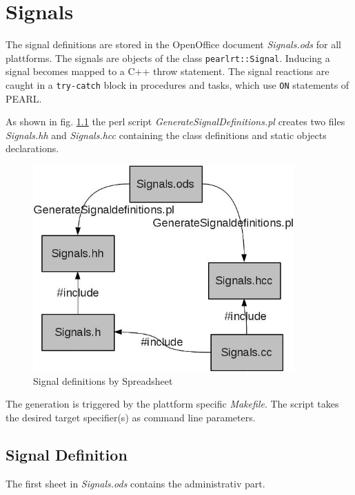 \chapter{Signals}
\label{chapter_signals}

The signal definitions are stored in the OpenOffice document {\em Signals.ods}
for all plattforms.
The signals are objects of the class \verb|pearlrt::Signal|. 
Inducing a signal becomes mapped to a C++ throw statement.
The signal reactions are caught in a \verb|try-catch| block in procedures and
tasks, which use \verb|ON| statements of PEARL.

As shown in fig. \ref{signals_ods} the perl script
{\em GenerateSignalDefinitions.pl} creates two files
{\em Signals.hh} and {\em Signals.hcc} containing the class definitions 
and static objects declarations. 

\begin{figure}[bpht]
\begin{center}
\includegraphics[width=10cm]{signals_ods.jpg}
\end{center}
\caption{Signal definitions by Spreadsheet}
\label{signals_ods}
\end{figure}

The generation is triggered by the plattform specific {\em Makefile}.
The script takes the desired target specifier(s) as command line
parameters.

\section{Signal Definition}
\label{sec_signal_definition}
The first sheet in {\em Signals.ods} contains the administrativ part.

